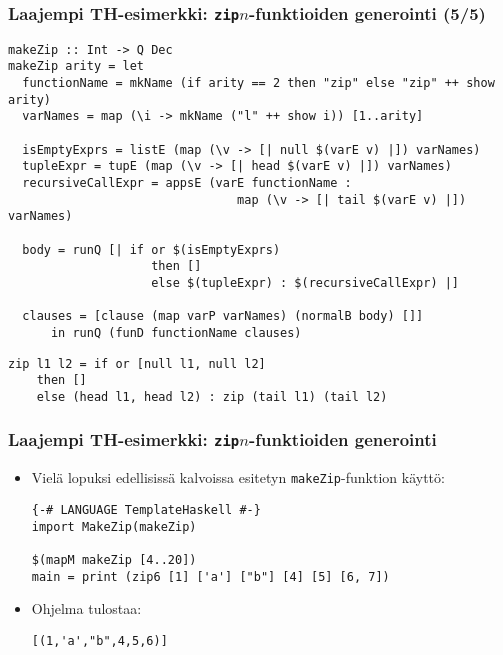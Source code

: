 \documentclass{beamer}
\begin{document}
\begin{frame}[fragile]
\frametitle{Laajempi TH-esimerkki: \texttt{zip$n$}-funktioiden generointi (5/5)}
\footnotesize
\begin{verbatim}
makeZip :: Int -> Q Dec
makeZip arity = let
  functionName = mkName (if arity == 2 then "zip" else "zip" ++ show arity)
  varNames = map (\i -> mkName ("l" ++ show i)) [1..arity]

  isEmptyExprs = listE (map (\v -> [| null $(varE v) |]) varNames)
  tupleExpr = tupE (map (\v -> [| head $(varE v) |]) varNames)
  recursiveCallExpr = appsE (varE functionName :
                                map (\v -> [| tail $(varE v) |]) varNames)

  body = runQ [| if or $(isEmptyExprs)
                    then []
                    else $(tupleExpr) : $(recursiveCallExpr) |]

  clauses = [clause (map varP varNames) (normalB body) []]
      in runQ (funD functionName clauses)
\end{verbatim}

\noindent\makebox[\linewidth]{\rule{\paperwidth}{0.4pt}}
\begin{verbatim}
zip l1 l2 = if or [null l1, null l2]
    then []
    else (head l1, head l2) : zip (tail l1) (tail l2)
\end{verbatim}

\end{frame}

\begin{frame}[fragile]
\frametitle{Laajempi TH-esimerkki: \texttt{zip$n$}-funktioiden generointi}
\begin{itemize}
\item{Vielä lopuksi edellisissä kalvoissa esitetyn \texttt{makeZip}-funktion käyttö:}
\begin{verbatim}
{-# LANGUAGE TemplateHaskell #-}
import MakeZip(makeZip)

$(mapM makeZip [4..20])
main = print (zip6 [1] ['a'] ["b"] [4] [5] [6, 7])
\end{verbatim}
\item{Ohjelma tulostaa:}
\begin{verbatim}
[(1,'a',"b",4,5,6)]
\end{verbatim}
\end{itemize}
\end{frame}
\end{document}
